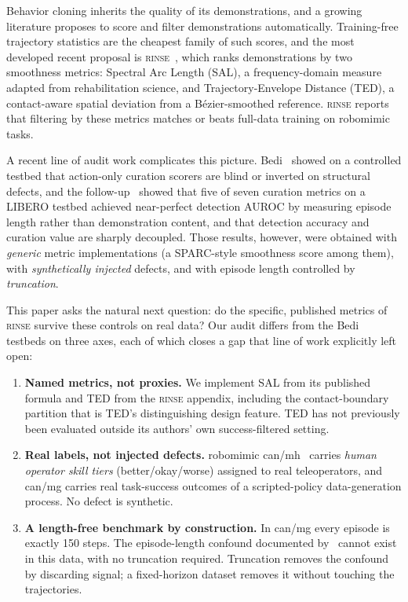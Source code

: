 \documentclass[10pt]{article}
\newcommand{\rinse}{\textsc{rinse}}
\begin{document}
Behavior cloning inherits the quality of its demonstrations, and a growing
literature proposes to score and filter demonstrations automatically.
Training-free trajectory statistics are the cheapest family of such scores,
and the most developed recent proposal is \rinse{}~\citep{rinse}, which ranks
demonstrations by two smoothness metrics: Spectral Arc Length (SAL), a
frequency-domain measure adapted from rehabilitation science, and
Trajectory-Envelope Distance (TED), a contact-aware spatial deviation from a
B\'ezier-smoothed reference. \rinse{} reports that filtering by these metrics
matches or beats full-data training on robomimic tasks.

A recent line of audit work complicates this picture.
Bedi~\citep{bedi-audit} showed on a controlled testbed that action-only
curation scorers are blind or inverted on structural defects, and the
follow-up~\citep{bedi-policy} showed that five of seven curation metrics on a
LIBERO testbed achieved near-perfect detection AUROC by measuring episode
length rather than demonstration content, and that detection accuracy and
curation value are sharply decoupled. Those results, however, were obtained
with \emph{generic} metric implementations (a SPARC-style smoothness score
among them), with \emph{synthetically injected} defects, and with episode
length controlled by \emph{truncation}.

This paper asks the natural next question: do the specific, published metrics
of \rinse{} survive these controls on real data? Our audit differs from the
Bedi testbeds on three axes, each of which closes a gap that line of work
explicitly left open:

\begin{enumerate}
\item \textbf{Named metrics, not proxies.} We implement SAL from its
published formula and TED from the \rinse{} appendix, including the
contact-boundary partition that is TED's distinguishing design feature. TED
has not previously been evaluated outside its authors' own
success-filtered setting.
\item \textbf{Real labels, not injected defects.} robomimic
can/mh~\citep{robomimic} carries \emph{human operator skill tiers}
(better/okay/worse) assigned to real teleoperators, and can/mg carries real
task-success outcomes of a scripted-policy data-generation process. No defect
is synthetic.
\item \textbf{A length-free benchmark by construction.} In can/mg every
episode is exactly 150 steps. The episode-length confound documented
by~\citep{bedi-policy} cannot exist in this data, with no truncation
required. Truncation removes the confound by discarding signal; a
fixed-horizon dataset removes it without touching the trajectories.
\end{enumerate}
\end{document}
